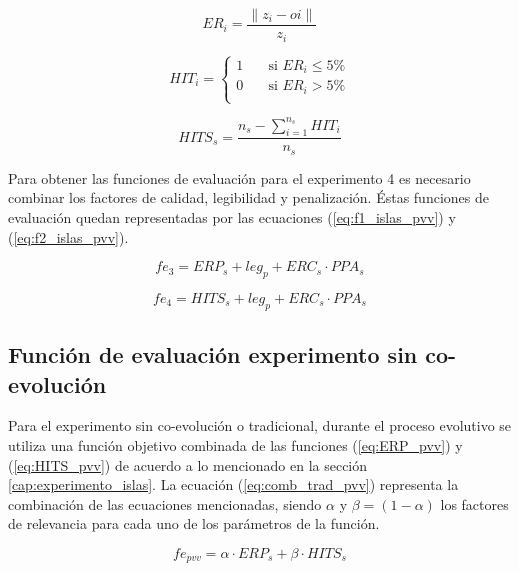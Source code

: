 \begin{equation}
\label{eq:ER_pvv}
	ER_{i} = \frac{\|z_{i}-o{i}\|}{z_{i}}
\end{equation}

\begin{equation}
\label{eq:HIT_pvv}
	HIT_{i} = 	\begin{cases}
					1       & \quad \text{si } ER_{i} \leq 5\% \\
					0  		& \quad \text{si } ER_{i} > 5\%	   \\
				\end{cases}
\end{equation}

\begin{equation}
\label{eq:HITS_pvv}
	HITS_{s} = 	\frac{n_{s} - \sum\limits_{i=1}^{n_{s}} HIT_{i} }{n_{s}}
\end{equation}

Para obtener las funciones de evaluación para el experimento 4 es necesario combinar los factores de calidad, legibilidad y penalización. Éstas funciones de evaluación quedan representadas por las ecuaciones (\ref{eq:f1_islas_pvv}) y (\ref{eq:f2_islas_pvv}).

\begin{equation}
\label{eq:f1_islas_pvv}
	fe_{3} = ERP_{s} + leg_{p} + ERC_{s} \cdot PPA_{s}
\end{equation}

\begin{equation}
\label{eq:f2_islas_pvv}
	fe_{4} = HITS_{s} + leg_{p} + ERC_{s} \cdot PPA_{s}
\end{equation}


\subsection{Función de evaluación experimento sin co-evolución}

Para el experimento sin co-evolución o tradicional, durante el proceso evolutivo se utiliza una función objetivo combinada de las funciones (\ref{eq:ERP_pvv}) y (\ref{eq:HITS_pvv}) de acuerdo a lo mencionado en la sección \ref{cap:experimento_islas}. La ecuación (\ref{eq:comb_trad_pvv}) representa la combinación de las ecuaciones mencionadas, siendo $\alpha$ y $\beta=(1-\alpha)$ los factores de relevancia para cada uno de los parámetros de la función.

\begin{equation}
\label{eq:comb_trad_pvv}
	fe_{pvv} = \alpha\cdot ERP_{s}+ \beta\cdot HITS_{s}
\end{equation}

